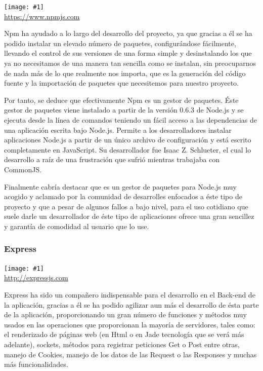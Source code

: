 \documentclass[11pt,openany]{book}
\newcommand{\logo}[2]{\medskip\begin{center}\texttt{[image: \#1]}\\\scriptsize\url{#2}\end{center}\bigskip}
\begin{document}
\logo{logos/npm.png}{https://www.npmjs.com}

Npm ha ayudado a lo largo del desarrollo del proyecto, ya que gracias a él se ha podido instalar un elevado número de paquetes, configurándose fácilmente, llevando el control de sus versiones de una forma simple y desinstalando los que ya no necesitamos de una manera tan sencilla como se instalan, sin preocuparnos de nada más de lo que realmente nos importa, que es la generación del código fuente y la importación de paquetes que necesitemos para nuestro proyecto.

Por tanto, se deduce que efectivamente Npm es un gestor de paquetes. Éste gestor de paquetes viene instalado a partir de la versión 0.6.3 de Node.js y se ejecuta desde la línea de comandos teniendo un fácil acceso a las dependencias de una aplicación escrita bajo Node.js. Permite a los desarrolladores instalar aplicaciones Node.js a partir de un único archivo de configuración y está escrito completamente en JavaScript. Su desarrollador fue Isaac Z. Schlueter, el cual lo desarrollo a raíz de una frustración que sufrió mientras trabajaba con CommonJS.

Finalmente cabría destacar que es un gestor de paquetes para Node.js muy acogido y aclamado por la comunidad de desarrolles enfocados a éste tipo de proyecto y que a pesar de algunos fallos a bajo nivel, para el uso cotidiano que suele darle un desarrollador de éste tipo de aplicaciones ofrece una gran sencillez y garantía de comodidad al usuario que lo use.

\subsubsection{Express}

\logo{logos/express.png}{http://expressjs.com}

Express ha sido un compañero indispensable para el desarrollo en el Back-end de la aplicación, gracias a él se ha podido agilizar aun más el desarrollo de ésta parte de la aplicación, proporcionando un gran número de funciones y métodos muy usados en las operaciones que proporcionan la mayoría de servidores, tales como: el renderizado de páginas web (en Html o en Jade tecnología que se verá más adelante), sockets, métodos para registrar peticiones Get o Post entre otras, manejo de Cookies, manejo de los datos de las Request o las Responses y muchas más funcionalidades.
\end{document}
